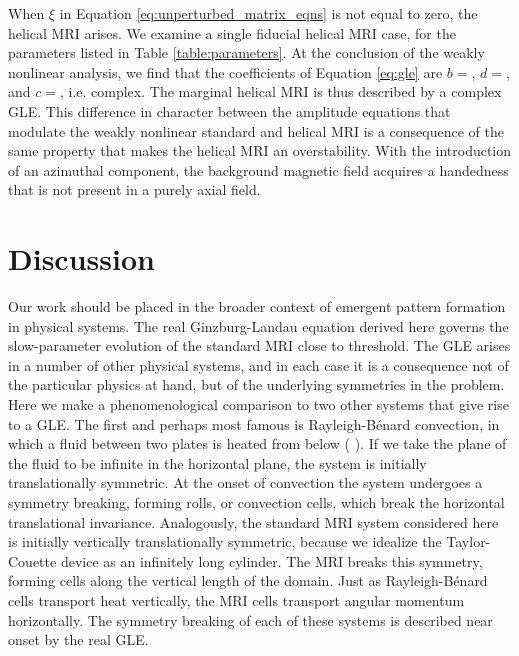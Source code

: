 \documentclass{emulateapj}
\newcommand{\citei}[1]{\citeauthor{#1} \citeyear{#1}}
\begin{document}
When $\xi$ in Equation \ref{eq:unperturbed_matrix_eqns} is not equal to zero, the helical MRI arises. We examine a single fiducial helical MRI case, for the parameters listed in Table \ref{table:parameters}. At the conclusion of the weakly nonlinear analysis, we find that the coefficients of Equation \ref{eq:gle} are $b = $, $d = $, and $c = $, i.e. complex. The marginal helical MRI is thus described by a complex GLE. This difference in character between the amplitude equations that modulate the weakly nonlinear standard and helical MRI is a consequence of the same property that makes the helical MRI an overstability. With the introduction of an azimuthal component, the background magnetic field acquires a handedness that is not present in a purely axial field.

\section{Discussion}

Our work should be placed in the broader context of emergent pattern formation in physical systems. The real Ginzburg-Landau equation derived here governs the slow-parameter evolution of the standard MRI close to threshold. The GLE arises in a number of other physical systems, and in each case it is a consequence not of the particular physics at hand, but of the underlying symmetries in the problem. Here we make a phenomenological comparison to two other systems that give rise to a GLE. The first and perhaps most famous is Rayleigh-B\'enard convection, in which a fluid between two plates is heated from below (\citei{Newell:1969wr}). If we take the plane of the fluid to be infinite in the horizontal plane, the system is initially translationally symmetric. %
At the onset of convection the system undergoes a symmetry breaking, forming rolls, or convection cells, which break the horizontal translational invariance. Analogously, the standard MRI system considered here is initially vertically translationally symmetric, because we idealize the Taylor-Couette device as an infinitely long cylinder. The MRI breaks this symmetry, forming cells along the vertical length of the domain. Just as Rayleigh-B\'enard cells transport heat vertically, the MRI cells transport angular momentum horizontally. The symmetry breaking of each of these systems is described near onset by the real GLE. 
\end{document}
